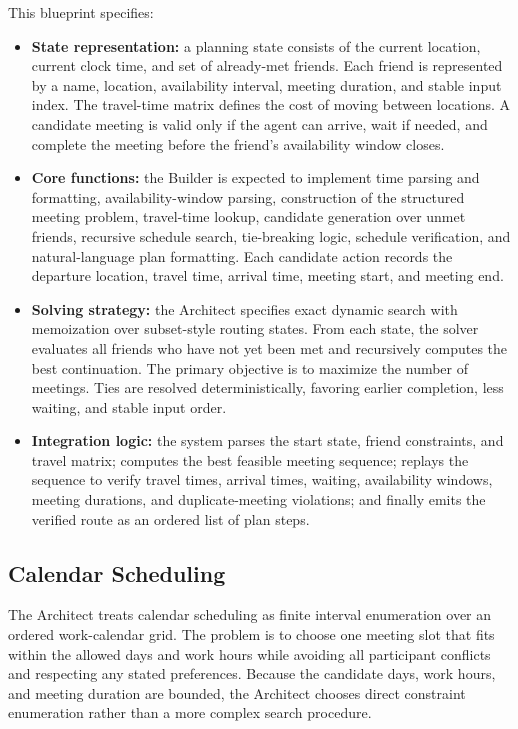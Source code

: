 This blueprint specifies:
\begin{itemize}
    \item \textbf{State representation:} a planning state consists of the
    current location, current clock time, and set of already-met friends.  Each
    friend is represented by a name, location, availability interval, meeting
    duration, and stable input index.  The travel-time matrix defines the cost
    of moving between locations.  A candidate meeting is valid only if the
    agent can arrive, wait if needed, and complete the meeting before the
    friend's availability window closes.

    \item \textbf{Core functions:} the Builder is expected to implement time
    parsing and formatting, availability-window parsing, construction of the
    structured meeting problem, travel-time lookup, candidate generation over
    unmet friends, recursive schedule search, tie-breaking logic, schedule
    verification, and natural-language plan formatting.  Each candidate action
    records the departure location, travel time, arrival time, meeting start,
    and meeting end.

    \item \textbf{Solving strategy:} the Architect specifies exact dynamic
    search with memoization over subset-style routing states.  From each state,
    the solver evaluates all friends who have not yet been met and recursively
    computes the best continuation.  The primary objective is to maximize the
    number of meetings.  Ties are resolved deterministically, favoring earlier
    completion, less waiting, and stable input order.

    \item \textbf{Integration logic:} the system parses the start state,
    friend constraints, and travel matrix; computes the best feasible meeting
    sequence; replays the sequence to verify travel times, arrival times,
    waiting, availability windows, meeting durations, and duplicate-meeting
    violations; and finally emits the verified route as an ordered list of
    plan steps.
\end{itemize}

\subsection{Calendar Scheduling}

The Architect treats calendar scheduling as finite interval enumeration over an
ordered work-calendar grid.  The problem is to choose one meeting slot that
fits within the allowed days and work hours while avoiding all participant
conflicts and respecting any stated preferences.  Because the candidate days,
work hours, and meeting duration are bounded, the Architect chooses direct
constraint enumeration rather than a more complex search procedure.

